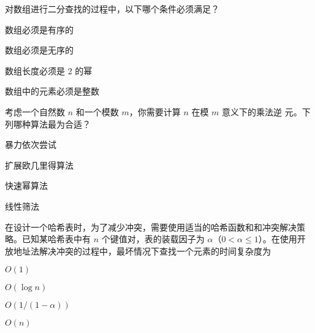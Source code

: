 \documentclass{exam-zh}
\begin{document}
\begin{solution}
    
\end{solution}


\begin{question}
    对数组进行二分查找的过程中，以下哪个条件必须满足？\paren[A]


\begin{choices}
    \item 数组必须是有序的
    \item 数组必须是无序的
    \item 数组长度必须是 2 的幂
    \item 数组中的元素必须是整数
\end{choices}

\end{question}

\begin{solution}
    
\end{solution}


\begin{question}
    考虑一个自然数 $n$ 和一个模数 $m$，你需要计算 $n$ 在模 $m$ 意义下的乘法逆
    元。下列哪种算法最为合适？\paren[B]

\begin{choices}
    \item  暴力依次尝试
    \item  扩展欧几里得算法
    \item  快速幂算法
    \item  线性筛法
\end{choices}
\end{question}


\begin{solution}
    
\end{solution}

\begin{question}
    在设计一个哈希表时，为了减少冲突，需要使用适当的哈希函数和和冲突解决策略。已知某哈希表中有 $n$ 个键值对，表的装载因子为 $\alpha$（$0 < \alpha \le 1$）。在使用开放地址法解决冲突的过程中，最坏情况下查找一个元素的时间复杂度为 \paren[D]
    

    \begin{choices}
        \item  $O(1)$
        \item  $O(\log n)$
        \item  $O (1/(1-\alpha))$
        \item  $O(n)$
    \end{choices}
\end{question}
\end{document}
